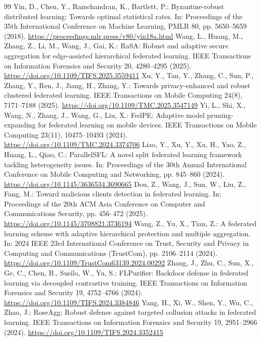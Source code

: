 \documentclass[11pt, a4paper, UTF8, fontset=fandol]{ctexart}
\begin{document}
\begin{thebibliography}{99}
     Yin, D., Chen, Y., Ramchandran, K., Bartlett, P.: Byzantine-robust distributed learning: Towards optimal statistical rates. In: Proceedings of the 35th International Conference on Machine Learning, PMLR 80, pp. 5650--5659 (2018). \url{https://proceedings.mlr.press/v80/yin18a.html}
     Wang, L., Huang, M., Zhang, Z., Li, M., Wang, J., Gai, K.: RaSA: Robust and adaptive secure aggregation for edge-assisted hierarchical federated learning. IEEE Transactions on Information Forensics and Security 20, 4280--4295 (2025). \url{https://doi.org/10.1109/TIFS.2025.3559411}
     Xu, Y., Tan, Y., Zhang, C., Sun, P., Zhang, Y., Ren, J., Jiang, H., Zhang, Y.: Towards privacy-enhanced and robust clustered federated learning. IEEE Transactions on Mobile Computing 24(8), 7171--7188 (2025). \url{https://doi.org/10.1109/TMC.2025.3547149}
     Yi, L., Shi, X., Wang, N., Zhang, J., Wang, G., Liu, X.: FedPE: Adaptive model pruning-expanding for federated learning on mobile devices. IEEE Transactions on Mobile Computing 23(11), 10475--10493 (2024). \url{https://doi.org/10.1109/TMC.2024.3374706}
     Liao, Y., Xu, Y., Xu, H., Yao, Z., Huang, L., Qiao, C.: ParallelSFL: A novel split federated learning framework tackling heterogeneity issues. In: Proceedings of the 30th Annual International Conference on Mobile Computing and Networking, pp. 845--860 (2024). \url{https://doi.org/10.1145/3636534.3690665}
     Dou, Z., Wang, J., Sun, W., Liu, Z., Fang, M.: Toward malicious clients detection in federated learning. In: Proceedings of the 20th ACM Asia Conference on Computer and Communications Security, pp. 456--472 (2025). \url{https://doi.org/10.1145/3708821.3736194}
     Wang, Z., Yu, X., Tian, Z.: A federated learning scheme with adaptive hierarchical protection and multiple aggregation. In: 2024 IEEE 23rd International Conference on Trust, Security and Privacy in Computing and Communications (TrustCom), pp. 2106--2114 (2024). \url{https://doi.org/10.1109/TrustCom63139.2024.00292}
     Zhang, J., Zhu, C., Sun, X., Ge, C., Chen, B., Susilo, W., Yu, S.: FLPurifier: Backdoor defense in federated learning via decoupled contrastive training. IEEE Transactions on Information Forensics and Security 19, 4752--4766 (2024). \url{https://doi.org/10.1109/TIFS.2024.3384846}
     Yang, H., Xi, W., Shen, Y., Wu, C., Zhao, J.: RoseAgg: Robust defense against targeted collusion attacks in federated learning. IEEE Transactions on Information Forensics and Security 19, 2951--2966 (2024). \url{https://doi.org/10.1109/TIFS.2024.3352415}

\end{thebibliography}
\end{document}

